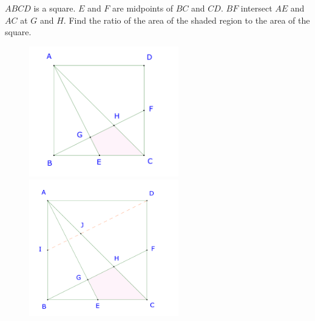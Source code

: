 \documentclass{article}
\begin{document}
\newpage

\begin{example*}[Example 19]
    $ABCD$ is a square. $E$ and $F$ are midpoints of $BC$ and $CD.$
    $BF$ intersect $AE$ and $AC$ at $G$ and $H$.
    Find the ratio of the area of the shaded region to the area of the square.
\end{example*}

\begin{figure}[h]
    \centering
    \begin{minipage}[t]{6.5cm}
        \begin{center}
            \includegraphics[width=6.5cm]{./svg/pdf/23-24-s3-i-p20.pdf}
        \end{center}
    \end{minipage}
    \qquad
    \begin{minipage}[t]{6.5cm}
        \centering
        \begin{center}
            \includegraphics[width=6.5cm]{./svg/pdf/23-24-s3-i-p20-s.pdf}
        \end{center}
    \end{minipage}
\end{figure}
\end{document}
